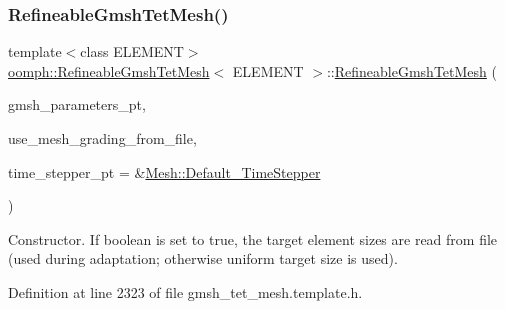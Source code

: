 \subsubsection{\texorpdfstring{Refineable\+Gmsh\+Tet\+Mesh()}{RefineableGmshTetMesh()}\hspace{0.1cm}{\footnotesize\ttfamily [1/2]}}
{\footnotesize\ttfamily template$<$class E\+L\+E\+M\+E\+NT$>$ \\
\hyperlink{classoomph_1_1RefineableGmshTetMesh}{oomph\+::\+Refineable\+Gmsh\+Tet\+Mesh}$<$ E\+L\+E\+M\+E\+NT $>$\+::\hyperlink{classoomph_1_1RefineableGmshTetMesh}{Refineable\+Gmsh\+Tet\+Mesh} (\begin{DoxyParamCaption}\item[{\hyperlink{classoomph_1_1GmshParameters}{Gmsh\+Parameters} $\ast$}]{gmsh\+\_\+parameters\+\_\+pt,  }\item[{const bool \&}]{use\+\_\+mesh\+\_\+grading\+\_\+from\+\_\+file,  }\item[{\hyperlink{classoomph_1_1TimeStepper}{Time\+Stepper} $\ast$}]{time\+\_\+stepper\+\_\+pt = {\ttfamily \&\hyperlink{classoomph_1_1Mesh_a12243d0fee2b1fcee729ee5a4777ea10}{Mesh\+::\+Default\+\_\+\+Time\+Stepper}} }\end{DoxyParamCaption})\hspace{0.3cm}{\ttfamily [inline]}}



Constructor. If boolean is set to true, the target element sizes are read from file (used during adaptation; otherwise uniform target size is used). 



Definition at line 2323 of file gmsh\+\_\+tet\+\_\+mesh.\+template.\+h.

\mbox{\label{classoomph_1_1RefineableGmshTetMesh_ac2e041133fd618679af2594465ee4758}} 
